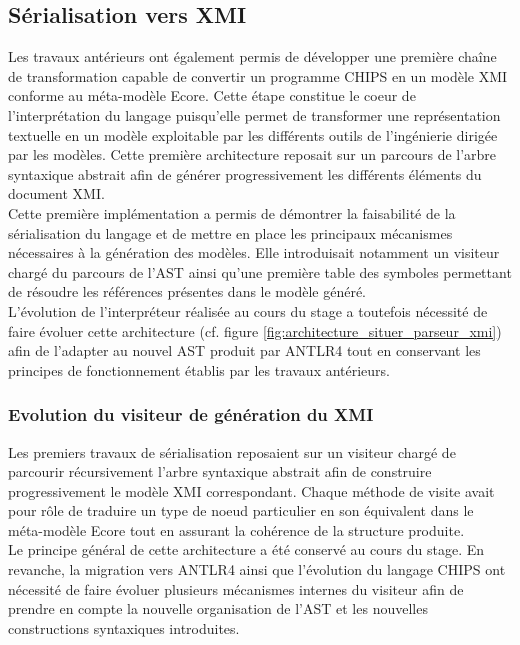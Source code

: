 \subsection{Sérialisation vers XMI}
\label{sec:XMI}

Les travaux antérieurs ont également permis de développer une première chaîne de transformation capable de convertir un programme CHIPS en un modèle XMI conforme au méta-modèle Ecore. Cette étape constitue le coeur de l'interprétation du langage puisqu'elle permet de transformer une représentation textuelle en un modèle exploitable par les différents outils de l'ingénierie dirigée par les modèles. Cette première architecture reposait sur un parcours de l'arbre syntaxique abstrait afin de générer progressivement les différents éléments du document XMI. \\

Cette première implémentation a permis de démontrer la faisabilité de la sérialisation du langage et de mettre en place les principaux mécanismes nécessaires à la génération des modèles. Elle introduisait notamment un visiteur chargé du parcours de l'AST ainsi qu'une première table des symboles permettant de résoudre les références présentes dans le modèle généré. \\

L'évolution de l'interpréteur réalisée au cours du stage a toutefois nécessité de faire évoluer cette architecture (cf. figure \ref{fig:architecture_situer_parseur_xmi}) afin de l'adapter au nouvel AST produit par ANTLR4 tout en conservant les principes de fonctionnement établis par les travaux antérieurs. \\

\subsubsection{Evolution du visiteur de génération du XMI}
\label{sec:generation_XMI}

Les premiers travaux de sérialisation reposaient sur un visiteur chargé de parcourir récursivement l'arbre syntaxique abstrait afin de construire progressivement le modèle XMI correspondant. Chaque méthode de visite avait pour rôle de traduire un type de noeud particulier en son équivalent dans le méta-modèle Ecore tout en assurant la cohérence de la structure produite. \\

Le principe général de cette architecture a été conservé au cours du stage. En revanche, la migration vers ANTLR4 ainsi que l'évolution du langage CHIPS ont nécessité de faire évoluer plusieurs mécanismes internes du visiteur afin de prendre en compte la nouvelle organisation de l'AST et les nouvelles constructions syntaxiques introduites. \\

